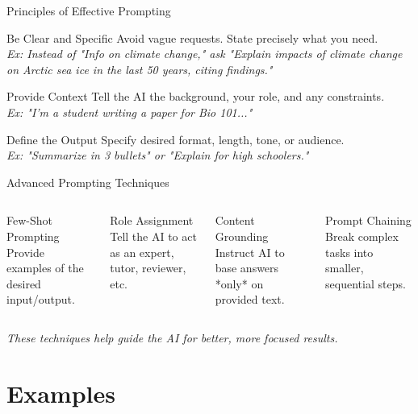 \documentclass{beamer}
\begin{document}
\begin{frame}{Principles of Effective Prompting}
\begin{block}{Be Clear and Specific}
Avoid vague requests. State precisely what you need. \\
\textit{Ex: Instead of "Info on climate change," ask "Explain impacts of climate change on Arctic sea ice in the last 50 years, citing findings."}
\end{block}
\pause 
\begin{block}{Provide Context}
Tell the AI the background, your role, and any constraints. \\
\textit{Ex: "I'm a student writing a paper for Bio 101..."}
\end{block}
\pause 
\begin{block}{Define the Output}
Specify desired format, length, tone, or audience. \\
\textit{Ex: "Summarize in 3 bullets" or "Explain for high schoolers."}
\end{block}
\end{frame}

\begin{frame}{Advanced Prompting Techniques}
\begin{columns}
\begin{block}{Few-Shot Prompting}
Provide examples of the desired input/output.
\end{block}
\pause 
\begin{block}{Role Assignment}
Tell the AI to act as an expert, tutor, reviewer, etc.
\end{block}
\pause 
\begin{block}{Content Grounding}
Instruct AI to base answers *only* on provided text.
\end{block}
\pause 
\begin{block}{Prompt Chaining}
Break complex tasks into smaller, sequential steps.
\end{block}
\end{columns}
\vspace{0.5cm}

\textit{These techniques help guide the AI for better, more focused results.}
\end{frame}

\section{Examples}
\end{document}
